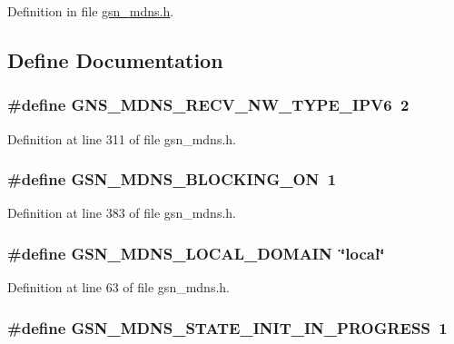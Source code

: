 Definition in file \hyperlink{a00526_source}{gsn\_\-mdns.h}.



\subsection{Define Documentation}
\hypertarget{a00526_ad1c790e56e227669ebea710774f898da}{
\subsubsection[{GNS\_\-MDNS\_\-RECV\_\-NW\_\-TYPE\_\-IPV6}]{\setlength{\rightskip}{0pt plus 5cm}\#define GNS\_\-MDNS\_\-RECV\_\-NW\_\-TYPE\_\-IPV6~2}}
\label{a00526_ad1c790e56e227669ebea710774f898da}


Definition at line 311 of file gsn\_\-mdns.h.

\hypertarget{a00526_a2415246cb4d8babf4d86c11437534374}{
\subsubsection[{GSN\_\-MDNS\_\-BLOCKING\_\-ON}]{\setlength{\rightskip}{0pt plus 5cm}\#define GSN\_\-MDNS\_\-BLOCKING\_\-ON~1}}
\label{a00526_a2415246cb4d8babf4d86c11437534374}


Definition at line 383 of file gsn\_\-mdns.h.

\hypertarget{a00526_abe4dc1c9abd2115cf4654dcf310bee86}{
\subsubsection[{GSN\_\-MDNS\_\-LOCAL\_\-DOMAIN}]{\setlength{\rightskip}{0pt plus 5cm}\#define GSN\_\-MDNS\_\-LOCAL\_\-DOMAIN~\char`\"{}local\char`\"{}}}
\label{a00526_abe4dc1c9abd2115cf4654dcf310bee86}


Definition at line 63 of file gsn\_\-mdns.h.

\hypertarget{a00526_a0d474ae74253a37caa617a1f86c6a643}{
\subsubsection[{GSN\_\-MDNS\_\-STATE\_\-INIT\_\-IN\_\-PROGRESS}]{\setlength{\rightskip}{0pt plus 5cm}\#define GSN\_\-MDNS\_\-STATE\_\-INIT\_\-IN\_\-PROGRESS~1}}
\label{a00526_a0d474ae74253a37caa617a1f86c6a643}


